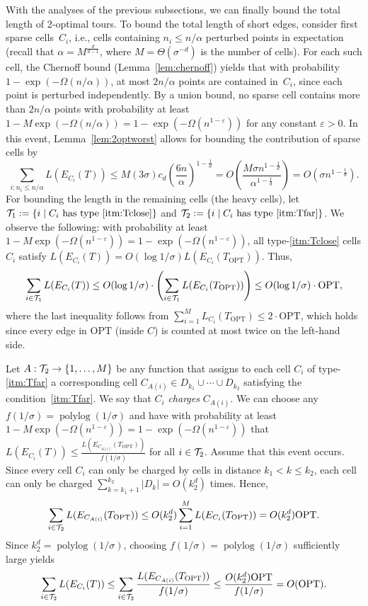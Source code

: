 \documentclass[11pt,DIV=12,a4paper]{scrartcl}
\DeclareMathOperator{\polylog}{polylog}
\newcommand{\Ttwo}{{\cal T}_2}
\newcommand{\Tone}{{\cal T}_1}
\newcommand{\itemref}[1]{\ref{itm:#1}}
\newcommand{\OPT}{\mathrm{OPT}}
\begin{document}
With the analyses of the previous subsections, we can finally bound the total length of 2-optimal tours.
To bound the total length of short edges, consider first sparse cells~$C_i$, i.e., cells containing $n_i\le n/\alpha$ perturbed points in expectation (recall that $\alpha = M^\frac{d}{d-1}$, where $M = \Theta(\sigma^{-d})$ is the number of cells). For each such cell, the Chernoff bound (Lemma~\ref{lem:chernoff}) yields that with probability $1-\exp(-\Omega(n/\alpha))$, at most $2n/\alpha$ points are contained in~$C_i$, since each point is perturbed independently. By a union bound, no sparse cell contains more than $2n/\alpha$ points with probability at least $1-M\exp(-\Omega(n/\alpha))=1-\exp(-\Omega(n^{1-\varepsilon}))$ for any constant $\varepsilon>0$. In this event, Lemma~\ref{lem:2optworst} allows for bounding the contribution of sparse cells by
\begin{equation}\label{eq:sparse}
 \sum_{i: n_i \le n/\alpha} L(E_{C_i}(T)) \le M (3\sigma) c_d \left(\frac{6n}{\alpha}\right)^{1-\frac{1}{d}} = O\left(\frac{M\sigma  n^{1-\frac{1}{d}}}{\alpha^{1-\frac{1}{d}}}\right) = O(\sigma n^{1-\frac{1}{d}}).
\end{equation}
For bounding the length in the remaining cells (the heavy cells), let $\Tone := \{i \mid C_i \text{ has type~\itemref{Tclose}}\}$ and $\Ttwo := \{i \mid C_i \text{ has type \itemref{Tfar}}\}$. We observe the following: with probability at least $1-M\exp(-\Omega(n^{1-\varepsilon}))=1-\exp(-\Omega(n^{1-\varepsilon}))$, all type-\itemref{Tclose} cells $C_i$ satisfy $L(E_{C_i}(T)) = O(\log 1/\sigma) L(E_{C_i}(T_\OPT))$. Thus,
\begin{equation}\label{eq:heavyT1}
 \sum_{i \in \Tone} L(E_{C_i}(T)) \le  O(\log 1/\sigma) \cdot \left(\sum_{i \in \Tone} L(E_{C_i}(T_\OPT))\right) \le O(\log 1/\sigma) \cdot \OPT,
\end{equation}
where the last inequality follows from  $\sum_{i=1}^M L_{C_i}(T_\OPT) \le 2\cdot\OPT$, which holds since every edge in $\OPT$ (inside $C$) is counted at most twice on the left-hand side.

Let $A: \Ttwo \to \{1,\dots,M\}$ be any function that assigns to each 
cell $C_i$ of type-\itemref{Tfar} a corresponding cell $C_{A(i)} \in D_{k_1}\cup \cdots \cup D_{k_2}$ satisfying the condition~\itemref{Tfar}. We say that $C_i$ \emph{charges} $C_{A(i)}$. We can choose any $f(1/\sigma)=\polylog(1/\sigma)$ and have with probability  at least $1-M\exp(-\Omega(n^{1-\varepsilon}))=1-\exp(-\Omega(n^{1-\varepsilon}))$ that $L(E_{C_i}(T)) \le \frac{L(E_{C_{A(i)}}(T_\OPT))}{f(1/\sigma)}$ for all $i\in \Ttwo$. Assume that this event occurs. Since every cell $C_i$ can only be charged by cells in distance $k_1 < k \le k_2$, each cell can only be charged $\sum_{k=k_1+1}^{k_2} |D_k| = O(k_2^d)$ times. Hence,
\[ \sum_{i \in \Ttwo} L(E_{C_{A(i)}}(T_\OPT)) \le O(k_2^d) \sum_{i=1}^M  L(E_{C_{i}}(T_\OPT)) = O(k_2^d) \OPT. \]
Since $k_2^d=\polylog(1/\sigma)$, choosing $f(1/\sigma)=\polylog(1/\sigma)$ sufficiently large yields
\begin{equation}\label{eq:heavyT2}
 \sum_{i \in \Ttwo} L(E_{C_i}(T)) \le  \sum_{i \in \Ttwo} \frac{L(E_{C_{A(i)}}(T_\OPT))}{f(1/\sigma)} \le \frac{O(k_2^d)\OPT}{f(1/\sigma)} = O(\OPT).
\end{equation}
\end{document}
